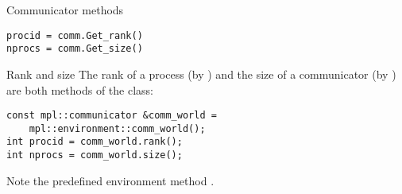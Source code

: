 \begin{pythonnote}{Communicator methods}
\lstset{language=Python}
\begin{lstlisting}
procid = comm.Get_rank()
nprocs = comm.Get_size()
\end{lstlisting}
\end{pythonnote}

\begin{mplnote}{Rank and size}
  \lstset{language=C++}
  The rank of a process (by ) and
  the size of a communicator (by )
  are both methods of the  class:
\begin{lstlisting}
const mpl::communicator &comm_world =
    mpl::environment::comm_world();
int procid = comm_world.rank();
int nprocs = comm_world.size();
\end{lstlisting}
  Note the predefined environment method .
\end{mplnote}
